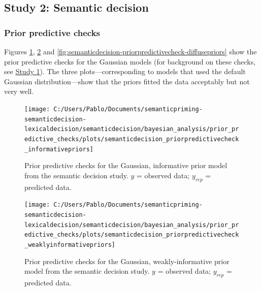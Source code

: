 \documentclass[
  12pt,
  man,floatsintext]{apa7}
\begin{document}
\hypertarget{study-2-semantic-decision-3}{%
\subsection{Study 2: Semantic decision}\label{study-2-semantic-decision-3}}

\hypertarget{prior-predictive-checks-1}{%
\subsubsection{Prior predictive checks}\label{prior-predictive-checks-1}}

Figures \ref{fig:semanticdecision-priorpredictivecheck-informativepriors}, \ref{fig:semanticdecision-priorpredictivecheck-weaklyinformativepriors} and \ref{fig:semanticdecision-priorpredictivecheck-diffusepriors} show the prior predictive checks for the Gaussian models (for background on these checks, see \protect\hyperlink{study1-bayesian-diagnostics}{\underline{Study 1}}). The three plots---corresponding to models that used the default Gaussian distribution---show that the priors fitted the data acceptably but not very well.



\begin{figure}

{\centering \texttt{[image: C:/Users/Pablo/Documents/semanticpriming-semanticdecision-lexicaldecision/semanticdecision/bayesian\_analysis/prior\_predictive\_checks/plots/semanticdecision\_priorpredictivecheck\_informativepriors]} 

}

\caption{Prior predictive checks for the Gaussian, informative prior model from the semantic decision study. \(y\) = observed data; \(y_{rep}\) = predicted data.}\label{fig:semanticdecision-priorpredictivecheck-informativepriors}
\end{figure}



\begin{figure}

{\centering \texttt{[image: C:/Users/Pablo/Documents/semanticpriming-semanticdecision-lexicaldecision/semanticdecision/bayesian\_analysis/prior\_predictive\_checks/plots/semanticdecision\_priorpredictivecheck\_weaklyinformativepriors]} 

}

\caption{Prior predictive checks for the Gaussian, weakly-informative prior model from the semantic decision study. \(y\) = observed data; \(y_{rep}\) = predicted data.}\label{fig:semanticdecision-priorpredictivecheck-weaklyinformativepriors}
\end{figure}
\end{document}
